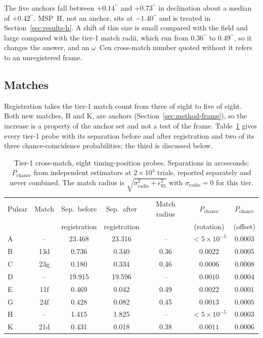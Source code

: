 \documentclass[11pt]{article}
\newcommand{\ocen}{$\omega$~Cen}
\newcommand{\as}{\ensuremath{^{\prime\prime}}}
\newcommand{\pchance}{\ensuremath{P_{\mathrm{chance}}}}
\begin{document}
The five anchors fall between $+0.14\as$ and $+0.73\as$ in declination about a median of $+0.42\as$. MSP~H, not an anchor, sits at $-1.40\as$ and is treated in Section~\ref{sec:results-h}. A shift of this size is small compared with the field and large compared with the tier-1 match radii, which run from $0.36\as$ to $0.49\as$, so it changes the answer, and an \ocen{} cross-match number quoted without it refers to an unregistered frame.

\subsection{Matches}
\label{sec:results-match}

Registration takes the tier-1 match count from three of eight to five of eight. Both new matches, B and K, are anchors (Section~\ref{sec:method-frame}), so the increase is a property of the anchor set and not a test of the frame. Table~\ref{tab:tier1} gives every tier-1 probe with its separation before and after registration and two of its three chance-coincidence probabilities; the third is discussed below.

\begin{table}[tbp]
\centering
\small
\caption{Tier-1 cross-match, eight timing-position probes. Separations in arcseconds; \pchance{} from independent estimators at $2\times10^{4}$ trials, reported separately and never combined. The match radius is $\sqrt{\sigma_{\mathrm{radio}}^{2}+\epsilon_{95}^{2}}$ with $\sigma_{\mathrm{radio}}=0$ for this tier.}
\label{tab:tier1}
\begin{tabular}{lcccccc}
\toprule
Pulsar & Match & Sep.\ before & Sep.\ after & Match radius & \pchance{} & \pchance{} \\
 & & registration & registration & & (rotation) & (offset) \\
\midrule
A & --   & 23.468 & 23.316 & --   & $<5\times10^{-5}$ & $0.0003$ \\
B & 13d  & 0.736  & 0.340  & 0.36 & $0.0022$ & $0.0005$ \\
C & 23g  & 0.180  & 0.334  & 0.46 & $0.0006$ & $0.0008$ \\
D & --   & 19.915 & 19.596 & --   & $0.0010$ & $0.0004$ \\
E & 11f  & 0.469  & 0.042  & 0.49 & $0.0022$ & $0.0001$ \\
G & 24f  & 0.428  & 0.082  & 0.45 & $0.0013$ & $0.0005$ \\
H & --   & 1.415  & 1.825  & --   & $<5\times10^{-5}$ & $0.0003$ \\
K & 21d  & 0.431  & 0.018  & 0.38 & $0.0011$ & $0.0006$ \\
\bottomrule
\end{tabular}
\end{table}
\end{document}
